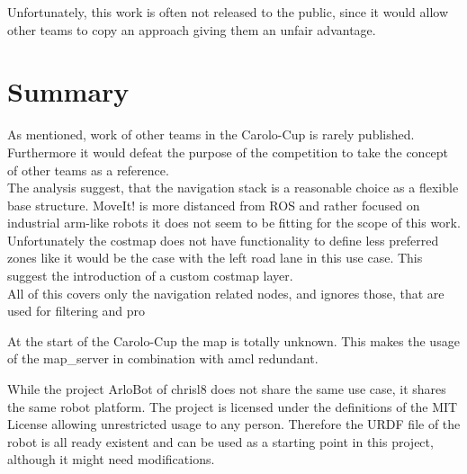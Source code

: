 Unfortunately, this work is often not released to the public, since it would allow other teams to copy an approach giving them an unfair advantage.\\

\section{Summary}
As mentioned, work of other teams in the Carolo-Cup is rarely published. Furthermore it would defeat the purpose of the competition to take the concept of other teams as a reference.\\

The analysis suggest, that the navigation stack is a reasonable choice as a flexible base structure. MoveIt! is more distanced from ROS and rather focused on industrial arm-like robots it does not seem to be fitting for the scope of this work.\\

Unfortunately the costmap does not have functionality to define less preferred zones like it would be the case with the left road lane in this use case. This suggest the introduction of a custom costmap layer.\\

All of this covers only the navigation related nodes, and ignores those, that are used for filtering and pro

At the start of the Carolo-Cup the map is totally unknown. This makes the usage of the map\_server in combination with amcl redundant.

While the project ArloBot of chrisl8 does not share the same use case, it shares the same robot platform. The project is licensed under the definitions of the MIT License allowing unrestricted usage to any person. Therefore the URDF file of the robot is all ready existent and can be used as a starting point in this project, although it might need modifications.












